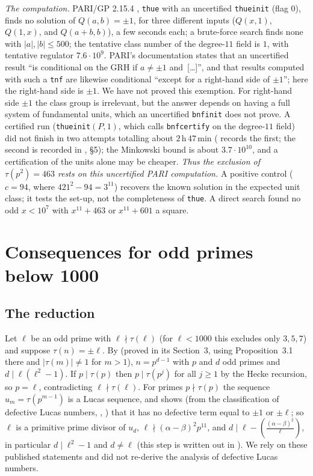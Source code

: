 \emph{The computation.} PARI/GP 2.15.4 \cite{PARI}, \texttt{thue} with an uncertified \texttt{thueinit} (flag $0$), finds no solution of $Q(a,b)=\pm1$, for three different inputs ($Q(x,1)$, $Q(1,x)$, and $Q(a+b,b)$), a few seconds each; a brute-force search finds none with $|a|,|b|\le500$; the tentative class number of the degree-$11$ field is $1$, with tentative regulator $7.6\cdot10^9$. PARI's documentation states that an uncertified result ``is conditional on the GRH if $a\ne\pm1$ and~[\dots]'', and that results computed with such a \texttt{tnf} are likewise conditional ``except for a right-hand side of $\pm1$''; here the right-hand side is $\pm1$. We have not proved this exemption. For right-hand side $\pm1$ the class group is irrelevant, but the answer depends on having a full system of fundamental units, which an uncertified \texttt{bnfinit} does not prove. A certified run (\texttt{thueinit}$(P,1)$, which calls \texttt{bnfcertify} on the degree-$11$ field) did not finish in two attempts totalling about $2$\,h\,$47$\,min ( records the first; the second is recorded in , \S5); the Minkowski bound is about $3.7\cdot10^{10}$, and a certification of the units alone may be cheaper. \emph{Thus the exclusion of $\tau(p^2)=463$ rests on this uncertified PARI computation.} A positive control ($c=94$, where $421^2-94=3^{11}$) recovers the known solution in the expected unit class; it tests the set-up, not the completeness of \texttt{thue}. A direct search found no odd $x<10^7$ with $x^{11}+463$ or $x^{11}+601$ a square.

\section{Consequences for odd primes below 1000}\label{sec:goto}

\subsection{The reduction}
Let $\ell$ be an odd prime with $\ell\nmid\tau(\ell)$ (for $\ell<1000$ this excludes only $3,5,7$) and suppose $\tau(n)=\pm\ell$. By \cite[Theorem~1.1]{BCOT} (proved in its Section~3, using Proposition~3.1 there and $|\tau(m)|\ne1$ for $m>1$), $n=p^{d-1}$ with $p$ and $d$ odd primes and $d\mid\ell(\ell^2-1)$. If $p\mid\tau(p)$ then $p\mid\tau(p^j)$ for all $j\ge1$ by the Hecke recursion, so $p=\ell$, contradicting $\ell\nmid\tau(\ell)$. For primes $p\nmid\tau(p)$ the sequence $u_m=\tau(p^{m-1})$ is a Lucas sequence, and \cite[Section~5]{BCOT} shows (from the classification of defective Lucas numbers, \cite[Lemma~2.1]{BCOT}, \cite{BHV}) that it has no defective term equal to $\pm1$ or $\pm\ell$; so $\ell$ is a primitive prime divisor of $u_d$, $\ell\nmid(\alpha-\beta)^2p^{11}$, and $d\mid\ell-(\frac{(\alpha-\beta)^2}\ell)$, in particular $d\mid\ell^2-1$ and $d\ne\ell$ (this step is written out in \cite[\S3.1]{Goto}). We rely on these published statements and did not re-derive the analysis of defective Lucas numbers.

